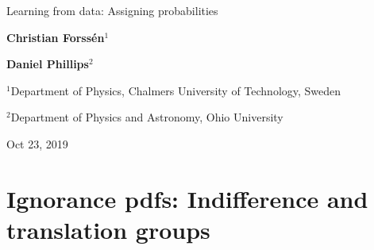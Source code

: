 \documentclass[%
oneside,                 %
final,                   %
10pt]{article}
\begin{document}

\newcommand{\exercisesection}[1]{\subsection*{#1}}







\thispagestyle{empty}

\begin{center}
{\LARGE\bf
\begin{spacing}{1.25}
Learning from data: Assigning probabilities
\end{spacing}
}
\end{center}


\begin{center}
{\bf Christian Forssén${}^{1}$} \\ [0mm]
\end{center}


\begin{center}
{\bf Daniel Phillips${}^{2}$} \\ [0mm]
\end{center}

\begin{center}
\centerline{{\small ${}^1$Department of Physics, Chalmers University of Technology, Sweden}}
\centerline{{\small ${}^2$Department of Physics and Astronomy, Ohio University}}
\end{center}
    

\begin{center}
Oct 23, 2019
\end{center}

\vspace{1cm}


\section{Ignorance pdfs: Indifference and translation groups}
\end{document}
